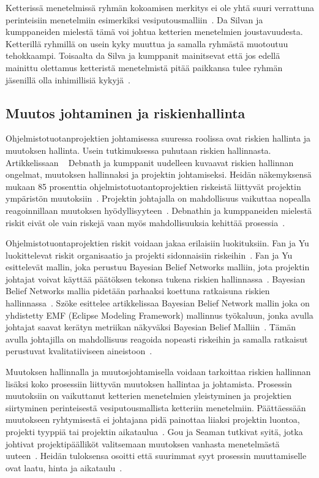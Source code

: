 \documentclass[finnish]{tktltiki2}
\theoremstyle{definition}
\theoremstyle{remark}
\begin{document}
Ketterissä menetelmissä ryhmän kokoamisen merkitys ei ole yhtä suuri verrattuna perinteisiin menetelmiin esimerkiksi vesiputousmalliin~\cite{daSilva2012}. Da Silvan ja kumppaneiden mielestä tämä voi johtua ketterien menetelmien joustavuudesta. Ketterillä ryhmillä on usein kyky muuttua ja samalla ryhmästä muotoutuu tehokkaampi. Toisaalta da Silva ja kumppanit mainitsevat että jos edellä mainittu olettamus ketteristä menetelmistä pitää paikkansa tulee ryhmän jäsenillä olla inhimillisiä kykyjä~\cite{daSilva2012}.


\subsection{Muutos johtaminen ja riskienhallinta}

Ohjelmistotuotanprojektien johtamisessa suuressa roolissa ovat riskien hallinta ja muutoksen hallinta. Usein tutkimuksessa puhutaan riskien hallinnasta. Artikkelissaan ~\cite{4017705} Debnath ja kumppanit uudelleen kuvaavat riskien hallinnan ongelmat, muutoksen hallinnaksi ja projektin johtamiseksi. Heidän näkemyksensä mukaan 85 prosenttia ohjelmistotuotantoprojektien riskeistä liittyvät projektin ympäristön muutoksiin~\cite{4017705}. Projektin johtajalla on mahdollisuus vaikuttaa nopealla reagoinnillaan muutoksen hyödyllisyyteen~\cite{4017705}. Debnathin ja kumppaneiden mielestä riskit eivät ole vain riskejä vaan myös mahdollisuuksia kehittää prosessia~\cite{4017705}.

Ohjelmistotuontaprojektien riskit voidaan jakaa erilaisiin luokituksiin. Fan ja Yu luokittelevat riskit organisaatio ja projekti sidonnaisiin riskeihin~\cite{fan2004bbn}. Fan ja Yu esittelevät mallin, joka perustuu Bayesian Belief Networks malliin, jota projektin johtajat voivat käyttää päätöksen tekonsa tukena riskien hallinnassa~\cite{fan2004bbn}. Bayesian Belief Networks mallia pidetään parhaaksi koettuna ratkaisuna riskien hallinnassa~\cite{szHokeproject}. Szöke esittelee artikkelissaa Bayesian Belief Network mallin joka on yhdistetty EMF (Eclipse Modeling Framework) mallinnus työkaluun, jonka avulla johtajat saavat kerätyn metriikan näkyväksi Bayesian Belief Malliin~\cite{szHokeproject}. Tämän avulla johtajilla on mahdollisuus reagoida nopeasti riskeihin ja samalla ratkaisut perustuvat kvalitatiiviseen aineistoon~\cite{szHokeproject}.

Muutoksen hallinnalla ja muutosjohtamisella voidaan tarkoittaa riskien hallinnan lisäksi koko prosessiin liittyvän muutoksen hallintaa ja johtamista. Prosessin muutoksiin on vaikuttanut ketterien menetelmien yleistyminen ja projektien siirtyminen perinteisestä vesiputousmallista ketteriin menetelmiin. Päättäessään muutokseen ryhtymisestä ei johtajana pidä painottaa liiaksi projektin luontoa, projekti tyyppiä tai projektin aikataulua~\cite{Chow2008961}. Gou ja Seaman tutkivat syitä, jotka johtivat projektipäälliköt valitsemaan muutoksen vanhasta menetelmästä uuteen~\cite{Guo:2008:SSP:1414004.1414046}. Heidän tuloksensa osoitti että suurimmat syyt prosessin muuttamiselle ovat laatu, hinta ja aikataulu~\cite{Guo:2008:SSP:1414004.1414046}.
\end{document}
